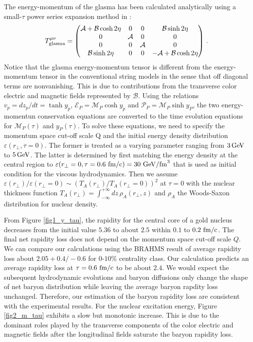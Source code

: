 \documentclass[a4paper]{jpconf}
\begin{document}
 
The energy-momentum of the glasma has been calculated analytically using a small-$\tau$ power series expansion method in \cite{Chen2015, Li2016}:
\begin{equation}
T^{\mu\nu}_{\rm{glasma}}=
\begin{pmatrix}
\mathcal{A}+\mathcal{B}\cosh{2\eta} & 0 & 0 & \mathcal{B}\sinh{2\eta} \\
0 & \mathcal{A} & 0 & 0 \\
0 & 0 & \mathcal{A} & 0 \\
\mathcal{B}\sinh{2\eta} & 0 & 0 & -\mathcal{A}+\mathcal{B}\cosh{2\eta} \\
\end{pmatrix} \, .
\end{equation}
Notice that the glasma energy-momentum tensor is different from the energy-momentum tensor in the conventional string models \cite{Mishustin2002} in the sense that off diagonal terms are nonvanishing. This is due to contributions from the transverse color electric and magnetic fields represented by $\mathcal{B}$. Using the relations $v_p = dz_p/dt =\tanh y_p$, $\mathcal{E}_P =\mathcal{M}_P\cosh y_p$ and $\mathcal{P}_P = \mathcal{M}_P\sinh y_P$, the two energy-momentun conservation equations are converted to the time evolution equations for  $\mathcal{M}_P(\tau)$ and $y_P(\tau)$. To solve these equations, we need to specify the momentum space cut-off scale  Q and the initial energy density distribution $\varepsilon(r_{\perp},\tau=0)$.  The former is treated as a varying parameter ranging from $3\,\rm{GeV}$ to $ 5\,\rm{GeV}$. The latter is determined by first matching the energy density at the central region to $\varepsilon(r_{\perp}=0,\tau =0.6\,\,\rm{fm/c}) = 30\,\, \rm{GeV/fm}^3$ \cite{Song2011} that is used as initial condition for the viscous hydrodynamics. Then we assume $\varepsilon(r_{\perp})/\varepsilon(r_{\perp}=0) \sim (T_A(r_{\perp})/T_A(r_{\perp}=0))^2$ at $\tau =0$ with the nuclear thickness function $T_A(r_{\perp})=\int_{-\infty}^{+\infty} dz \,\rho_A(r_{\perp}, z)$ and $\rho_A$ the Woods-Saxon distribution for nuclear density. 

From Figure \ref{fig1_y_tau}, the rapidity for the central core of a gold nucleus decreases from the initial value $5.36$ to about $2.5$ within $0.1$ to $ 0.2 \,\,\rm{fm/c}$.  
The final net rapidity loss does not depend on the momentum space cut-off scale $Q$. We can compare our calculations using the BRAHMS result \cite{BRAHMS2004} of average rapidity loss about $2.05 + 0.4/ - 0.6$ for $0$-$10\%$ centrality class. Our calculation predicts an average rapidity loss at $\tau=0.6 \,\, \rm{fm/c}$ to be about $2.4$. We would expect the subsequent hydrodynamic evolutions and baryon diffusions only change the shape of net baryon distribution while leaving the average baryon rapdity loss unchanged. Therefore, our estimation of the baryon rapidity loss are consistent with the experimental results.   For the nuclear excitation energy, Figure \ref{fig2_m_tau} exhibits a slow but monotonic increase. This is due to the dominant roles played by the transverse components of the color electric and magnetic fields after the longitudinal fields saturate the baryon rapidity loss. 
\end{document}
